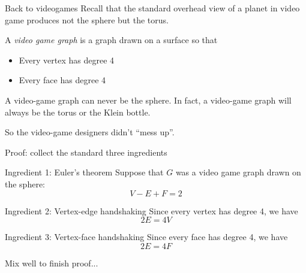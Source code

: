 \documentclass{beamer}
\begin{document}
\begin{frame}{Back to videogames}
  Recall that the standard overhead view of a planet in video game produces not the sphere but the torus.
  \begin{definition} A \emph{video game graph} is a graph drawn on a surface so that
    \begin{itemize}
    \item Every vertex has degree 4
    \item Every face has degree 4
    \end{itemize}
  \end{definition}

  \begin{theorem} A video-game graph can never be the sphere.  In fact, a video-game graph will always be the torus or the Klein bottle.
       \end{theorem}
So the video-game designers didn't ``mess up''.
\end{frame}
\begin{frame}{Proof: collect the standard three ingredients}
  \begin{block}{Ingredient 1: Euler's theorem}
    Suppose that $G$ was a video game graph drawn on the sphere: $$V-E+F=2$$
  \end{block}
  \begin{block}{Ingredient 2: Vertex-edge handshaking}
    Since every vertex has degree 4, we have
    $$2E=4V$$
  \end{block}

  \begin{block}{Ingredient 3: Vertex-face handshaking}
    Since every face has degree 4, we have
    $$2E=4F$$
    \end{block}
Mix well to finish proof...
  
  \end{frame}
\end{document}
